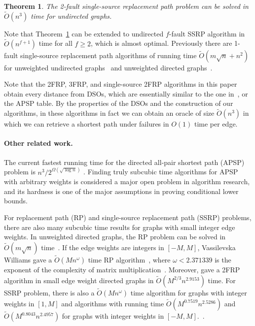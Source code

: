 \documentclass[11pt]{article}
\theoremstyle{plain}
\newtheorem{theorem}{Theorem}[section]
\theoremstyle{definition}
\begin{document}
\begin{theorem}\label{thm:SSRP1}
    The 2-fault single-source replacement path problem can be solved in $\tilde{O}(n^3)$ time for undirected graphs.
\end{theorem}

Note that Theorem~\ref{thm:SSRP1} can be extended to undirected $f$-fault SSRP algorithm in $\tilde{O}(n^{f+1})$ time for all $f\geq 2$, which is almost optimal. Previously there are 1-fault single-source replacement path algorithms of running time $\tilde{O}(m\sqrt{n}+n^2)$ for unweighted undirected graphs~\cite{CC19,DG22} and unweighted directed graphs~\cite{CM20}.

Note that the 2FRP, 3FRP, and single-source 2FRP algorithms in this paper obtain every distance from DSOs, which are essentially similar to the one in~\cite{2009A}, or the APSP table. By the properties of the DSOs and the construction of our algorithms, in these algorithms in fact we can obtain an oracle of size $\tilde{O}(n^3)$ in which we can retrieve a shortest path under failures in $O(1)$ time per edge.

\paragraph{Other related work.}

The current fastest running time for the directed all-pair shortest path (APSP) problem is $n^3/2^{\Omega(\sqrt{\log n})}$ \cite{Williams14}. Finding truly subcubic time algorithms for APSP with arbitrary weights is considered a major open problem in algorithm research, and its hardness is one of the major assumptions in proving conditional lower bounds.

For replacement path (RP) and single-source replacement path (SSRP) problems, there are also many subcubic time results for graphs with small integer edge weights. In unweighted directed graphs, the RP problem can be solved in $\tilde{O}(m\sqrt{n})$ time~\cite{ACC19}. If the edge weights are integers in $[-M,M]$, Vassilevska Williams gave a $\tilde{O}(Mn^{\omega})$ time RP algorithm~\cite{Williams14}, where $\omega<2.371339$ is the exponent of the complexity of matrix multiplication~\cite{alman2024,VXXZ24,DWZ23}. Moreover, \cite{WWX22} gave a 2FRP algorithm in small edge weight directed graphs in $\tilde{O}(M^{2/3}n^{2.9153})$ time. For SSRP problem, there is also a $\tilde{O}(Mn^{\omega})$ time algorithm for graphs with integer weights in $[1,M]$ and algorithms with running time $\tilde{O}(M^{0.7519}n^{2.5286})$ and $\tilde{O}(M^{0.8043}n^{2.4957})$ for graphs with integer weights in $[-M,M]$.~\cite{GV20,GV12,GPVX21}.
\end{document}

